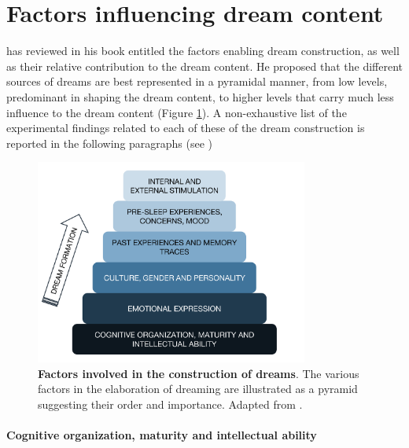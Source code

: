 \section{Factors influencing dream content}
\label{sec:dream-content:factors}

\citet{de_koninck_sleep_2012} has reviewed in his book entitled  the factors enabling dream construction, as well as their relative contribution to the dream content. He proposed that the different sources of dreams are best represented in a pyramidal manner, from low levels, predominant in shaping the dream content, to higher levels that carry much less influence to the dream content (Figure \ref{fig:intro:koninck}). A non-exhaustive list of the experimental findings related to each of these  of the dream construction is reported in the following paragraphs (see \citealp{blagrove_trait_2010, schredl_characteristics_2010, ruby_experimental_2011, de_koninck_sleep_2012})

\begin{figure}[htb]
	\centering
	\includegraphics[width=0.8\textwidth]{Fig/Intro/Intro_Pyramid_dream_construction/Intro_pyramid_dream.png}
	\caption[Factors involved in the construction of dreams]{\textbf{Factors involved in the construction of dreams}. The various factors in the elaboration of dreaming are illustrated as a pyramid suggesting their order and importance. Adapted from \citet{de_koninck_sleep_2012}.}
	\label{fig:intro:koninck}
\end{figure}


\paragraph{Cognitive organization, maturity and intellectual ability}

